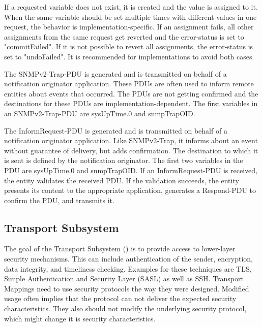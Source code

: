 If a requested variable does not exist, it is created and the value is assigned to it. When the same variable should be set multiple times with different values in one request, the behavior is implementation-specific. If an assignment fails, all other assignments from the same request get reverted and the error-status is set to "commitFailed". If it is not possible to revert all assignments, the error-status is set to "undoFailed". It is recommended for implementations to avoid both cases.

\newpage
The SNMPv2-Trap-PDU is generated and is transmitted on behalf of a notification originator application. These PDUs are often used to inform remote entities about events that occurred. The PDUs are not getting confirmed and the destinations for these PDUs are implementation-dependent. The first variables in an SNMPv2-Trap-PDU are sysUpTime.0 and snmpTrapOID.

The InformRequest-PDU is generated and is transmitted on behalf of a notification originator application. Like SNMPv2-Trap, it informs about an event without guarantee of delivery, but adds confirmation. The destination to which it is sent is defined by the notification originator. The first two variables in the PDU are sysUpTime.0 and snmpTrapOID. If an InformRequest-PDU is received, the entity validates the received PDU. If the validation succeeds, the entity presents its content to the appropriate application, generates a Respond-PDU to confirm the PDU, and transmits it.

\subsection{Transport Subsystem}
\label{Section:SNMP-TransportSubsystem}

The goal of the Transport Subsystem (\cite{RFC:RFC5590:2009}) is to provide access to lower-layer security mechanisms. This can include authentication of the sender, encryption, data integrity, and timeliness checking. Examples for these techniques are TLS, Simple Authentication and Security Layer (SASL) as well as SSH. Transport Mappings need to use security protocols the way they were designed. Modified usage often implies that the protocol can not deliver the expected security characteristics. They also should not modify the underlying security protocol, which might change it is security characteristics.

